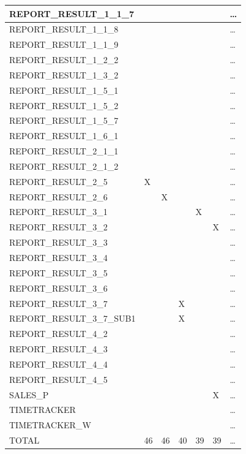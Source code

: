 \documentclass{cslthse-msc}
\begin{document}
\begin{appendices}
\begin{table}[H]
{\begin{tabular}{ l | p{5em} | p{5em}| p{5em}| p{5em}| l l|  }
	 REPORT\_RESULT\_1\_1\_7 &  &  &  &  &  & \dots \\ \hline
	 REPORT\_RESULT\_1\_1\_8 &  &  &  &  &  & \dots \\ \hline
	 REPORT\_RESULT\_1\_1\_9 &  &  &  &  &  & \dots \\ \hline
	 REPORT\_RESULT\_1\_2\_2 &  &  &  &  &  & \dots \\ \hline
	 REPORT\_RESULT\_1\_3\_2 &  &  &  &  &  & \dots \\ \hline
	 REPORT\_RESULT\_1\_5\_1 &  &  &  &  &  & \dots \\ \hline
	 REPORT\_RESULT\_1\_5\_2 &  &  &  &  &  & \dots \\ \hline
	 REPORT\_RESULT\_1\_5\_7 &  &  &  &  &  & \dots \\ \hline
	 REPORT\_RESULT\_1\_6\_1 &  &  &  &  &  & \dots \\ \hline
	 REPORT\_RESULT\_2\_1\_1 &  &  &  &  &  & \dots \\ \hline
	 REPORT\_RESULT\_2\_1\_2 &  &  &  &  &  & \dots \\ \hline
	 REPORT\_RESULT\_2\_5 & X &  &  &  &  & \dots \\ \hline
	 REPORT\_RESULT\_2\_6 &  & X &  &  &  & \dots \\ \hline
	 REPORT\_RESULT\_3\_1 &  &  &  & X &  & \dots \\ \hline
	 REPORT\_RESULT\_3\_2 &  &  &  &  & X & \dots \\ \hline
	 REPORT\_RESULT\_3\_3 &  &  &  &  &  & \dots \\ \hline
	 REPORT\_RESULT\_3\_4 &  &  &  &  &  & \dots \\ \hline
	 REPORT\_RESULT\_3\_5 &  &  &  &  &  & \dots \\ \hline
	 REPORT\_RESULT\_3\_6 &  &  &  &  &  & \dots \\ \hline
	 REPORT\_RESULT\_3\_7 &  &  & X &  &  & \dots \\ \hline
	 REPORT\_RESULT\_3\_7\_SUB1 &  &  & X &  &  & \dots \\ \hline
	 REPORT\_RESULT\_4\_2 &  &  &  &  &  & \dots \\ \hline
	 REPORT\_RESULT\_4\_3 &  &  &  &  &  & \dots \\ \hline
	 REPORT\_RESULT\_4\_4 &  &  &  &  &  & \dots \\ \hline
	 REPORT\_RESULT\_4\_5 &  &  &  &  &  & \dots \\ \hline
	 SALES\_P &  &  &  &  & X & \dots \\ \hline
	 TIMETRACKER &  &  &  &  &  & \dots \\ \hline
	 TIMETRACKER\_W &  &  &  &  &  & \dots \\ \hline
	TOTAL & 46 & 46 & 40 & 39 & 39 & \dots \\ \hline


\end{tabular}}
\end{table}
\end{appendices}
\end{document}
